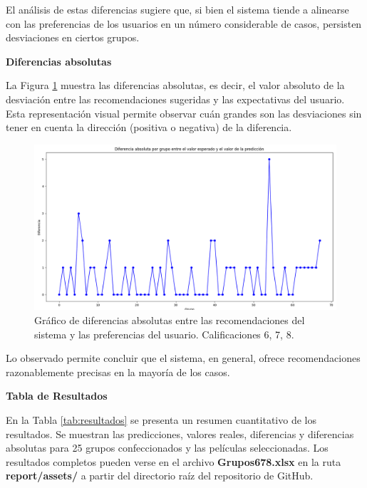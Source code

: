 \documentclass[twocolumn, fontsize=10pt]{article}
\begin{document}
El análisis de estas diferencias sugiere que, si bien el sistema tiende a alinearse con las preferencias de los usuarios en un número considerable de casos, persisten desviaciones en ciertos grupos.

\textbf{Diferencias absolutas}

La Figura \ref{fig:absolutas} muestra las diferencias absolutas, es decir, el valor absoluto de la desviación entre las recomendaciones sugeridas y las expectativas del usuario. Esta representación visual permite observar cuán grandes son las desviaciones sin tener en cuenta la dirección (positiva o negativa) de la diferencia.

\begin{figure}[h]
    \centering
    \includegraphics[width=\columnwidth]{assets/absolutas678.png}
    \caption{Gráfico de diferencias absolutas entre las recomendaciones del sistema y las preferencias del usuario. Calificaciones 6, 7, 8.}
    \label{fig:absolutas}
\end{figure}

Lo observado permite concluir que el sistema, en general, ofrece recomendaciones razonablemente precisas en la mayoría de los casos.

\textbf{Tabla de Resultados}

En la Tabla \ref{tab:resultados} se presenta
un resumen cuantitativo de los resultados. Se muestran 
las predicciones, valores reales, diferencias y 
diferencias absolutas para 25 grupos confeccionados y 
las películas seleccionadas. Los resultados completos 
pueden verse en el archivo \textbf{Grupos678.xlsx} en la ruta \textbf{report/assets/} a partir del directorio raíz del repositorio de GitHub.
\end{document}
